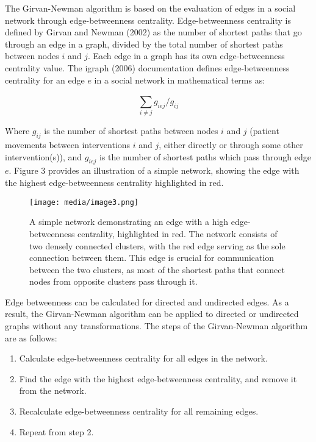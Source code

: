 \documentclass{article}
\begin{document}
The Girvan-Newman algorithm is based on the evaluation of edges in a
social network through edge-betweenness centrality. Edge-betweenness
centrality is defined by Girvan and Newman (2002) as the number of
shortest paths that go through an edge in a graph, divided by the total
number of shortest paths between nodes \(i\) and \(j\). Each edge in a
graph has its own edge-betweenness centrality value.
The igraph (2006) documentation defines edge-betweenness centrality for an
edge \(e\) in a social network in mathematical terms as:

\[\sum_{i \neq j}^{}g_{iej}/g_{ij}\]

Where \(g_{ij}\) is the number of shortest paths between nodes \(i\) and
\(j\) (patient movements between interventions \(i\) and \(j\), either
directly or through some other intervention(s)), and \(g_{iej}\) is the
number of shortest paths which pass through edge \(e\). Figure 3
provides an illustration of a simple network, showing the edge with the
highest edge-betweenness centrality highlighted in red.
\begin{figure}
\centering
\texttt{[image: media/image3.png]}

\caption{A simple network demonstrating an edge with a high
edge-betweenness centrality, highlighted in red. The network consists of
two densely connected clusters, with the red edge serving as the sole
connection between them. This edge is crucial for communication between
the two clusters, as most of the shortest paths that connect nodes from
opposite clusters pass through it.}
\end{figure}

Edge betweenness can be calculated for directed and undirected edges. As
a result, the Girvan-Newman algorithm can be applied to directed or
undirected graphs without any transformations. The steps of the
Girvan-Newman algorithm are as follows:

\begin{enumerate}
\def\labelenumi{\arabic{enumi}.}
\item
  Calculate edge-betweenness centrality for all edges in the network.
\item
  Find the edge with the highest edge-betweenness centrality, and remove
  it from the network.
\item
  Recalculate edge-betweenness centrality for all remaining edges.
\item
  Repeat from step 2.
\end{enumerate}
\end{document}

